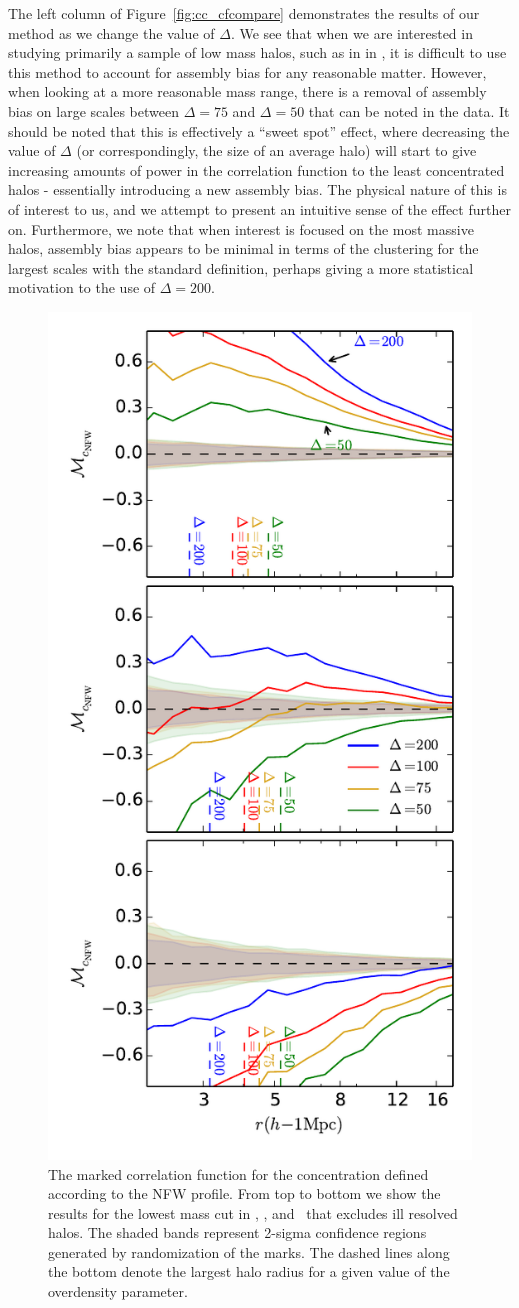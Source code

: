 \documentclass[usenatbib,usegraphicx,letterpaper]{mn2e}
\begin{document}

The left column of Figure~\ref{fig:cc_cfcompare} demonstrates the results of our method as we change the value of $\Delta$. We see that when we are interested in studying primarily a sample of low mass halos, such as in in \simA, it is difficult to use this method to account for assembly bias for any reasonable matter. However, when looking at a more reasonable mass range, there is a removal of assembly bias on large scales between $\Delta = 75$ and $\Delta=50$ that can be noted in the data. It should be noted that this is effectively a ``sweet spot'' effect, where decreasing the value of $\Delta$ (or correspondingly, the size of an average halo) will start to give increasing amounts of power in the correlation function to the least concentrated halos - essentially introducing a new assembly bias. The physical nature of this is of interest to us, and we attempt to present an intuitive sense of the effect further on. Furthermore, we note that when interest is focused on the most massive halos, assembly bias appears to be minimal in terms of the clustering for the largest scales with the standard definition, perhaps giving a more statistical motivation to the use of $\Delta = 200$.

\begin{figure}
	\centering
	\includegraphics[width=.4\textwidth]{all_mcf_cnfw_z00_cutcomp.pdf}
	\caption{The marked correlation function for the concentration defined according to the NFW profile. From top to bottom we show the results for the lowest mass cut in \simA, \simB, and \simC \ that excludes ill resolved halos. The shaded bands represent 2-sigma confidence regions generated by randomization of the marks. The dashed lines along the bottom denote the largest halo radius for a given value of the overdensity parameter.}
	\label{fig:cc_mcf_cnfw}
\end{figure}
\end{document}
